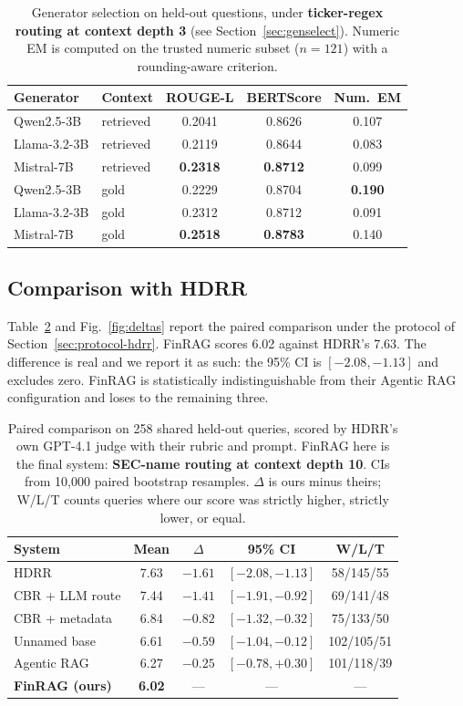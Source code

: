 \documentclass[conference]{IEEEtran}
\begin{document}
\begin{table}[t]
\caption{Generator selection on held-out questions, under
\textbf{ticker-regex routing at context depth 3} (see
Section~\ref{sec:genselect}). Numeric EM is computed on the trusted numeric
subset ($n=121$) with a rounding-aware criterion.}
\label{tab:generation}
\centering
\small
\begin{tabular}{llccc}
\toprule
Generator & Context & ROUGE-L & BERTScore & Num.\ EM \\
\midrule
Qwen2.5-3B & retrieved & 0.2041 & 0.8626 & 0.107 \\
Llama-3.2-3B & retrieved & 0.2119 & 0.8644 & 0.083 \\
Mistral-7B & retrieved & \textbf{0.2318} & \textbf{0.8712} & 0.099 \\
\midrule
Qwen2.5-3B & gold & 0.2229 & 0.8704 & \textbf{0.190} \\
Llama-3.2-3B & gold & 0.2312 & 0.8712 & 0.091 \\
Mistral-7B & gold & \textbf{0.2518} & \textbf{0.8783} & 0.140 \\
\bottomrule
\end{tabular}
\end{table}

\subsection{Comparison with HDRR}
\label{sec:vshdrr}
Table~\ref{tab:vshdrr} and Fig.~\ref{fig:deltas} report the paired comparison under the protocol of
Section~\ref{sec:protocol-hdrr}. FinRAG scores 6.02 against HDRR's 7.63. The
difference is real and we report it as such: the 95\% CI is
$[-2.08,-1.13]$ and excludes zero. FinRAG is statistically indistinguishable
from their Agentic RAG configuration and loses to the remaining three.

\begin{table}[t]
\caption{Paired comparison on 258 shared held-out queries, scored by HDRR's own
GPT-4.1 judge with their rubric and prompt. FinRAG here is the final system:
\textbf{SEC-name routing at context depth 10}. CIs from 10{,}000 paired
bootstrap resamples. $\Delta$ is ours minus theirs; W/L/T counts queries where
our score was strictly higher, strictly lower, or equal.}
\label{tab:vshdrr}
\centering
\footnotesize
\setlength{\tabcolsep}{4pt}
\begin{tabular}{lcccc}
\toprule
System & Mean & $\Delta$ & 95\% CI & W/L/T \\
\midrule
HDRR & 7.63 & $-1.61$ & $[-2.08,-1.13]$ & 58/145/55 \\
CBR + LLM route & 7.44 & $-1.41$ & $[-1.91,-0.92]$ & 69/141/48 \\
CBR + metadata & 6.84 & $-0.82$ & $[-1.32,-0.32]$ & 75/133/50 \\
Unnamed base & 6.61 & $-0.59$ & $[-1.04,-0.12]$ & 102/105/51 \\
Agentic RAG & 6.27 & $-0.25$ & $[-0.78,+0.30]$ & 101/118/39 \\
\midrule
\textbf{FinRAG (ours)} & \textbf{6.02} & --- & --- & --- \\
\bottomrule
\end{tabular}
\end{table}
\end{document}
